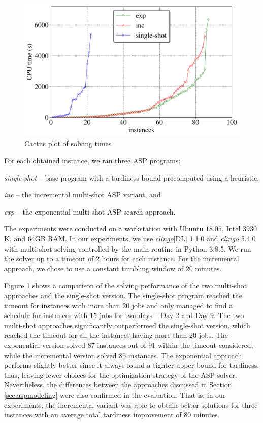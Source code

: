 \documentclass[submission,copyright,creativecommons]{eptcs}
\begin{document}
\begin{figure}[t]
	\centering
	\includegraphics[width=0.6\linewidth]{figures/cactus_time_font20.pdf}
	\caption{Cactus plot of solving times \label{fig:cactus:time}}
\end{figure}

For each obtained instance, we ran three ASP programs: 
\begin{enumerate*}[label=\emph{(\arabic*)}]	
	\item \emph{single-shot} -- base program with a tardiness bound precomputed using a heuristic,
	\item \emph{inc} -- the incremental multi-shot ASP variant, and 
	\item \emph{exp} -- the exponential multi-shot ASP search approach.
\end{enumerate*}
The experiments were conducted on a workstation with Ubuntu $18.05$, Intel  $3930$K, and $64$GB RAM. In our experiments, we use \emph{clingo}[DL] 1.1.0 and \emph{clingo} 5.4.0 with multi-shot solving controlled by the main routine in Python 3.8.5. We run the solver up to a timeout of $2$ hours for each instance. For the incremental approach, we chose to use a constant tumbling window of $20$ minutes.


Figure \ref{fig:cactus:time} shows a comparison of the solving performance of the two multi-shot approaches and the single-shot version. The single-shot program reached the timeout for instances with more than $20$ jobs and only managed to find a schedule for instances with $15$ jobs for two days -- Day 2 and Day 9.
%
The two multi-shot approaches significantly outperformed the single-shot version, which reached the timeout for all the instances having more than $20$ jobs. The exponential version solved $87$ instances out of $91$ within the timeout considered, while the incremental version solved $85$ instances. The exponential approach performs slightly better since it always found a tighter upper bound for tardiness, thus, leaving fewer choices for the optimization strategy of the ASP solver. Nevertheless, the differences between the approaches discussed in Section \ref{sec:aspmodeling} were also confirmed in the evaluation. That is, in our experiments, the incremental variant was able to obtain better solutions for three instances with an average total tardiness improvement of 80 minutes.
\end{document}
